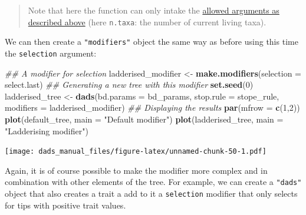 \documentclass[]{book}
\newenvironment{Shaded}{\begin{snugshade}}{\end{snugshade}}
\newcommand{\CommentTok}[1]{\textcolor[rgb]{0.56,0.35,0.01}{\textit{#1}}}
\newcommand{\ControlFlowTok}[1]{\textcolor[rgb]{0.13,0.29,0.53}{\textbf{#1}}}
\newcommand{\DataTypeTok}[1]{\textcolor[rgb]{0.13,0.29,0.53}{#1}}
\newcommand{\DecValTok}[1]{\textcolor[rgb]{0.00,0.00,0.81}{#1}}
\newcommand{\KeywordTok}[1]{\textcolor[rgb]{0.13,0.29,0.53}{\textbf{#1}}}
\newcommand{\NormalTok}[1]{#1}
\newcommand{\OperatorTok}[1]{\textcolor[rgb]{0.81,0.36,0.00}{\textbf{#1}}}
\newcommand{\StringTok}[1]{\textcolor[rgb]{0.31,0.60,0.02}{#1}}
\begin{document}
\begin{Shaded}
\end{Shaded}

\begin{quote}
Note that here the function can only intake the \protect\hyperlink{allowarguments}{allowed arguments as described above} (here \texttt{n.taxa}: the number of current living taxa).
\end{quote}

We can then create a \texttt{"modifiers"} object the same way as before using this time the \texttt{selection} argument:

\begin{Shaded}
\begin{Highlighting}[]
\CommentTok{## A modifier for selection}
\NormalTok{ladderised_modifier <-}\StringTok{ }\KeywordTok{make.modifiers}\NormalTok{(}\DataTypeTok{selection =}\NormalTok{ select.last)}
\CommentTok{## Generating a new tree with this modifier}
\KeywordTok{set.seed}\NormalTok{(}\DecValTok{0}\NormalTok{)}
\NormalTok{ladderised_tree <-}\StringTok{ }\KeywordTok{dads}\NormalTok{(}\DataTypeTok{bd.params =}\NormalTok{ bd_params,}
                        \DataTypeTok{stop.rule =}\NormalTok{ stope_rule,}
                        \DataTypeTok{modifiers =}\NormalTok{ ladderised_modifier)}
\CommentTok{## Displaying the results}
\KeywordTok{par}\NormalTok{(}\DataTypeTok{mfrow =} \KeywordTok{c}\NormalTok{(}\DecValTok{1}\NormalTok{,}\DecValTok{2}\NormalTok{))}
\KeywordTok{plot}\NormalTok{(default_tree,    }\DataTypeTok{main =} \StringTok{"Default modifier"}\NormalTok{)}
\KeywordTok{plot}\NormalTok{(ladderised_tree, }\DataTypeTok{main =} \StringTok{"Ladderising modifier"}\NormalTok{)}
\end{Highlighting}
\end{Shaded}

\texttt{[image: dads\_manual\_files/figure-latex/unnamed-chunk-50-1.pdf]}

Again, it is of course possible to make the modifier more complex and in combination with other elements of the tree.
For example, we can create a \texttt{"dads"} object that also creates a trait a add to it a \texttt{selection} modifier that only selects for tips with positive trait values.
\end{document}
